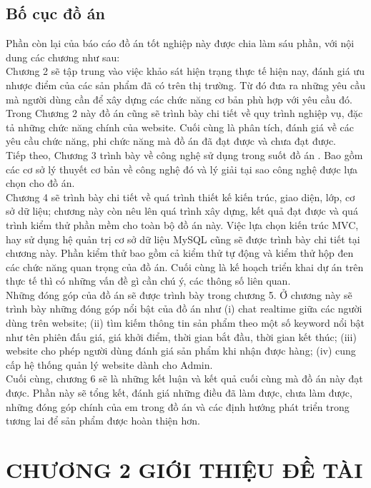 \documentclass{article}
\begin{document}
\subsection{Bố cục đồ án}
Phần còn lại của báo cáo đồ án tốt nghiệp này được chia làm sáu phần, với nội dung các chương như sau: \\
Chương 2 sẽ tập trung vào việc khảo sát hiện trạng thực tế hiện nay, đánh giá ưu nhược điểm của các sản phẩm đã có trên thị trường. Từ đó đưa ra những yêu cầu mà người dùng cần để xây dựng các chức năng cơ bản phù hợp với yêu cầu đó. Trong Chương 2 này đồ án cũng sẽ trình bày chi tiết về quy trình nghiệp vụ, đặc tả những chức năng chính của website. Cuối cùng là phân tích, đánh giá về các yêu cầu chức năng, phi chức năng mà đồ án đã đạt được và chưa đạt được.\\
Tiếp theo, Chương 3 trình bày về công nghệ sử dụng trong suốt đồ án . Bao gồm các cơ sở lý thuyết cơ bản về công nghệ đó và lý giải tại sao công nghệ được lựa chọn cho đồ án. \\
Chương 4 sẽ trình bày chi tiết về quá trình thiết kế kiến trúc, giao diện, lớp, cơ sở dữ liệu; chương này còn nêu lên quá trình xây dựng, kết quả đạt được và quá trình kiểm thử phần mềm cho toàn bộ đồ án này. Việc lựa chọn kiến trúc MVC, hay sử dụng hệ quản trị cơ sở dữ liệu MySQL cũng sẽ được trình bày chi tiết tại chương này. Phần kiểm thử bao gồm cả kiểm thử tự động và kiểm thử hộp đen các chức năng quan trọng của đồ án. Cuối cùng là kế hoạch triển khai dự án trên thực tế thì có những vấn đề gì cần chú ý, các thông số liên quan.\\
Những đóng góp của đồ án sẽ được trình bày trong chương 5. Ở chương này sẽ trình bày những đóng góp nổi bật của đồ án như (i) chat realtime giữa các người dùng trên website; (ii) tìm kiếm thông tin sản phẩm theo một số keyword nổi bật như tên phiên đấu giá, giá khởi điểm, thời gian bắt đầu, thời gian kết thúc; (iii) website cho phép người dùng đánh giá sản phẩm khi nhận được hàng; (iv) cung cấp hệ thống quản lý website dành cho Admin.\\
Cuối cùng, chương 6 sẽ là những kết luận và kết quả cuối cùng mà đồ án này đạt được. Phần này sẽ tổng kết, đánh giá những điều đã làm được, chưa làm được, những đóng góp chính của em trong đồ án và các định hướng phát triển trong tương lai để sản phẩm được hoàn thiện hơn. 
\newpage%

\section*{CHƯƠNG 2 GIỚI THIỆU ĐỀ TÀI}
\setcounter{section}{2}
\setcounter{subsection}{0}
\end{document}
